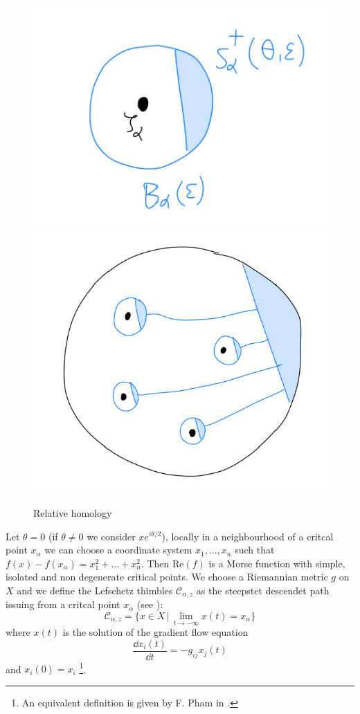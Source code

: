 \documentclass[11pt,a4paper,twoside,leqno,noamsfonts]{amsart}
\numberwithin{equation}{section}
\begin{document}
\begin{figure}[h]
\includegraphics[scale=0.5]{Cattura}
\includegraphics[scale=0.3]{Cattura2}
\caption{Relative homology}\label{fig:relative_homology}
\end{figure}

Let $\theta=0$ (if $\theta\neq 0$ we consider $xe^{i\theta/2}$), locally in a neighbourhood of a critcal point $x_\alpha$ we can choose a coordinate system $x_1,...,x_n$ such that $f(x)-f(x_\alpha)=x_1^2+...+x_n^2$. Then $\mathrm{Re}(f)$ is a Morse function with simple, isolated and non degenerate critical points. We choose a Riemannian metric $g$ on $X$ and we define the Lefschetz thimbles $\mathcal{C}_{\alpha,z}$ as the steepstet descendet path issuing from a critcal point $x_\alpha$ (see \cite{Witten}): 
\begin{equation}
\mathcal{C}_{\alpha,z}=\lbrace x\in X\,\big\vert \, \lim_{t\to -\infty} x(t)=x_\alpha\rbrace
\end{equation}
where $x(t)$ is the solution of the gradient flow equation \[\frac{\dd x_i(t)}{\dd t}=-g_{ij}x_j(t)\] and $x_i(0)=x_i$ \footnote{An equivalent definition is given by F. Pham in \cite{pham}.}. 
\end{document}
